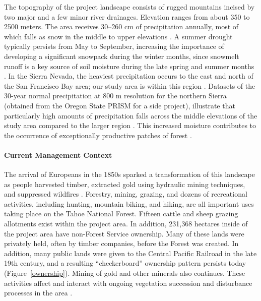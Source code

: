 The topography of the project landscape consists of rugged mountains incised by two major and a few minor river drainages. Elevation ranges from about 350 to 2500 meters. The area receives 30--260 cm of precipitation annually, most of which falls as snow in the middle to upper elevations \citep{Storer1963}. A summer drought typically persists from May to September, increasing the importance of developing a significant snowpack during the winter months, since snowmelt runoff is a key source of soil moisture during the late spring and summer months \citep{Minnich2007}. In the Sierra Nevada, the heaviest precipitation occurs to the east and north of the San Francisco Bay area; our study area is within this region \citep{VanWag2006}. Datasets of the 30-year normal precipitation at 800 m resolution for the northern Sierra (obtained from the Oregon State PRISM for a side project), illustrate that particularly high amounts of precipitation falls across the middle elevations of the study area compared to the larger region \citep{PRISMClimateGroup2004}. This increased moisture contributes to the occurrence of exceptionally productive patches of forest \citep[][ Alan Doerr, personal communication]{Littell2012}.





\paragraph{Current Management Context}

The arrival of Europeans in the 1850s sparked a transformation of this landscape as people harvested timber, extracted gold using hydraulic mining techniques, and suppressed wildfires \citep{Storer1963}. Forestry, mining, grazing, and dozens of recreational activities, including hunting, mountain biking, and hiking, are all important uses taking place on the Tahoe National Forest. Fifteen cattle and sheep grazing allotments exist within the project area. In addition, 231,368 hectares inside of the project area have non-Forest Service ownership. Many of these lands were privately held, often by timber companies, before the Forest was created. In addition, many public lands were given to the Central Pacific Railroad in the late 19th century, and a resulting ``checkerboard'' ownership pattern persists today (Figure~\ref{ownership}). Mining of gold and other minerals also continues. These activities affect and interact with ongoing vegetation succession and disturbance processes in the area \citep{USDAForestService2014}.

